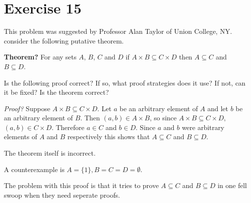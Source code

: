 \documentclass[11pt]{article}
\begin{document}
\section*{Exercise 15}

This problem was suggested by Professor Alan Taylor of Union College, NY. consider 
the following putative theorem.

\textbf{Theorem?} For any sets $A$, $B$, $C$ and $D$ if $A \times B \subseteq C \times D$ 
then $A \subseteq C$ and $B \subseteq D$.

Is the following proof correct? If so, what proof strategies does it use? If not,
can it be fixed? Is the theorem correct?

\textit{Proof?} Suppose $A \times B \subseteq C \times D$. Let $a$ be an arbitrary
element of $A$ and let $b$ be an arbitrary element of $B$. Then $(a, b) \in A \times B$, 
so since $A \times B \subseteq C \times D$, $(a, b) \in C \times D$. Therefore 
$a \in C$ and $b \in D$. Since $a$ and $b$ were arbitrary elements of $A$ and 
$B$ respectively this shows that $A \subseteq C$ and $B \subseteq D$.

The theorem itself is incorrect.

A counterexample is $A = \{1\}, B = C = D = \emptyset$.

The problem with this proof is that it tries to prove $A \subseteq C$ and 
$B \subseteq D$ in one fell swoop when they need seperate proofs.
\end{document}
